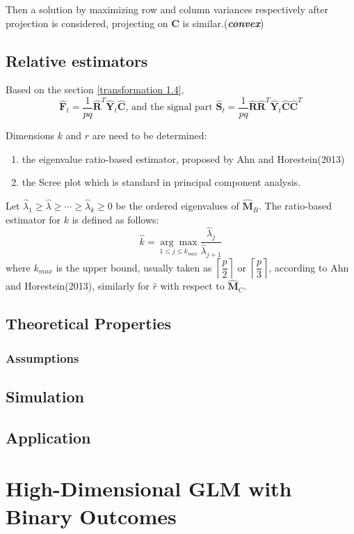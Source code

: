 \documentclass{article}[12pt]
\def\lc{\left\lceil}
\def\rc{\right\rceil}
\begin{document}
\noindent Then a solution by maximizing row and column variances respectively after projection is considered, projecting on $\mathbf{C}$ is similar.(\textbf{\textit{convex}})


\subsection{Relative estimators}
Based on the section \ref{transformation 1.4}, 
$$\mathbf{\widehat{F}}_t = \dfrac{1}{pq}\mathbf{\widehat{R}}^T\mathbf{\widehat{Y}}_t\mathbf{\widehat{C}}\text{, and the signal part }\mathbf{\widehat{S}}_t = \dfrac{1}{pq}\mathbf{\widehat{R}}\mathbf{\widehat{R}}^T\mathbf{\widehat{Y}}_t\mathbf{\widehat{C}}\mathbf{\widehat{C}}^T$$
 
\noindent Dimensions $k$ and $r$ are need to be determined:
\begin{enumerate}
    \item the eigenvalue ratio-based estimator, proposed by Ahn and Horestein(2013) 
    \item the Scree plot which is standard in principal component analysis. 
\end{enumerate}
\noindent Let $\hat{\lambda}_1 \geq \hat{\lambda} \geq \cdots \geq \hat{\lambda}_k \geq 0$ be the ordered eigenvalues of $\mathbf{\widehat{M}}_R$. The ratio-based estimator for $k$ is defined as follows:
    $$\widehat{k} = \underset{1 \leq j \leq k_{max}}{\arg\max }\dfrac{\widehat{\lambda}_j}{\widehat{\lambda}_{j+1}}$$
    where $k_{max}$ is the upper bound, usually taken as $\lc\dfrac{p}{2}\rc$ or $\lc\dfrac{p}{3}\rc$, according to Ahn and Horestein(2013),  similarly for $\widehat{r}$ with respect to $\mathbf{\widehat{M}}_C$.  
\subsection{Theoretical Properties}
\subsubsection{Assumptions}
 

\subsection{Simulation}

\subsection{Application}
\section{High-Dimensional GLM with Binary Outcomes}
\end{document}
